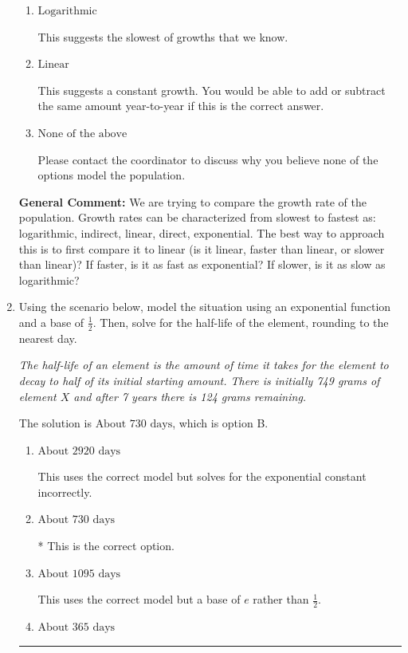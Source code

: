 \documentclass{extbook}[14pt]
\newcommand{\litem}[1]{\item #1

\rule{\textwidth}{0.4pt}}
\begin{document}
\begin{enumerate}
{\begin{enumerate}[label=\Alph*.]
This suggests the fastest of growths that we know.
\item \( \text{Logarithmic} \)

This suggests the slowest of growths that we know.
\item \( \text{Linear} \)

This suggests a constant growth. You would be able to add or subtract the same amount year-to-year if this is the correct answer.
\item \( \text{None of the above} \)

Please contact the coordinator to discuss why you believe none of the options model the population.
\end{enumerate}

\textbf{General Comment:} We are trying to compare the growth rate of the population. Growth rates can be characterized from slowest to fastest as: logarithmic, indirect, linear, direct, exponential. The best way to approach this is to first compare it to linear (is it linear, faster than linear, or slower than linear)? If faster, is it as fast as exponential? If slower, is it as slow as logarithmic?
}
\litem{
Using the scenario below, model the situation using an exponential function and a base of $\frac{1}{2}$. Then, solve for the half-life of the element, rounding to the nearest day.

\begin{center}
    \textit{ The half-life of an element is the amount of time it takes for the element to decay to half of its initial starting amount. There is initially 749 grams of element $X$ and after 7 years there is 124 grams remaining. }
\end{center}


The solution is \( \text{About } 730 \text{ days} \), which is option B.\begin{enumerate}[label=\Alph*.]
\item \( \text{About } 2920 \text{ days} \)

This uses the correct model but solves for the exponential constant incorrectly.
\item \( \text{About } 730 \text{ days} \)

* This is the correct option.
\item \( \text{About } 1095 \text{ days} \)

This uses the correct model but a base of $e$ rather than $\frac{1}{2}$.
\item \( \text{About } 365 \text{ days} \)


\end{enumerate}}
\end{enumerate}
\end{document}
